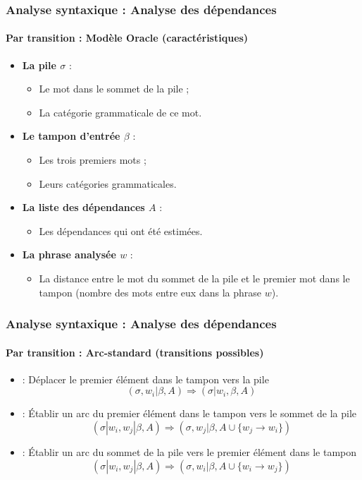 \documentclass[xcolor=table]{beamer}
\begin{document}
\begin{frame}
\frametitle{Analyse syntaxique : Analyse des dépendances}
\framesubtitle{Par transition : Modèle Oracle (caractéristiques)}

\begin{itemize}
	\item \textbf{La pile $\sigma$} :
	\begin{itemize}
		\item Le mot dans le sommet de la pile ;
		\item La catégorie grammaticale de ce mot.
	\end{itemize}

	\item \textbf{Le tampon d'entrée $\beta$} :
	\begin{itemize}
		\item Les trois premiers mots ;
		\item Leurs catégories grammaticales.
	\end{itemize}

	\item \textbf{La liste des dépendances $A$} :
	\begin{itemize}
		\item Les dépendances qui ont été estimées.
	\end{itemize}

	\item \textbf{La phrase analysée $w$} :
	\begin{itemize}
		\item La distance entre le mot du sommet de la pile et le premier mot dans le tampon (nombre des mots entre eux dans la phrase $w$).
	\end{itemize}

\end{itemize}

\end{frame}

\begin{frame}
\frametitle{Analyse syntaxique : Analyse des dépendances}
\framesubtitle{Par transition : Arc-standard (transitions possibles)}

\begin{itemize}
	\item {} : Déplacer le premier élément dans le tampon vers la pile 
	\[ (\sigma, w_i|\beta, A) \Rightarrow  (\sigma|w_i, \beta, A) \]
	
	\item {} : Établir un arc du premier élément dans le tampon vers le sommet de la pile
	\[ (\sigma|w_i, w_j|\beta, A) \Rightarrow  (\sigma, w_j|\beta, A \cup \{w_j \rightarrow w_i \}) \] 
	
	\item {} : Établir un arc du sommet de la pile vers le premier élément dans le tampon
	\[ (\sigma|w_i, w_j|\beta, A) \Rightarrow  (\sigma, w_i|\beta, A \cup \{w_i \rightarrow w_j \}) \] 
\end{itemize}

\end{frame}
\end{document}
